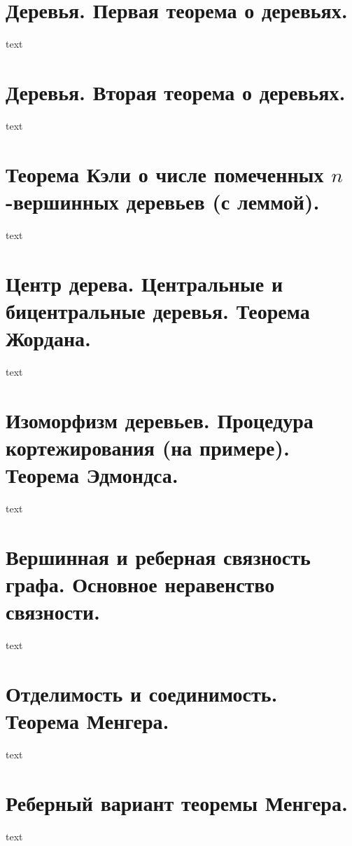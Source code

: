 \section{Деревья. Первая теорема о деревьях.}

text

\section{Деревья. Вторая теорема о деревьях.}

text

\section{Теорема Кэли о числе помеченных $n$-вершинных деревьев (с леммой).}

text

\section{Центр дерева. Центральные и бицентральные деревья. Теорема Жордана.}

text

\section{Изоморфизм деревьев. Процедура кортежирования (на примере). Теорема Эдмондса.}

text

\section{Вершинная и реберная связность графа. Основное неравенство связности.}

text

\section{Отделимость и соединимость. Теорема Менгера.}

text

\section{Реберный вариант теоремы Менгера.}

text